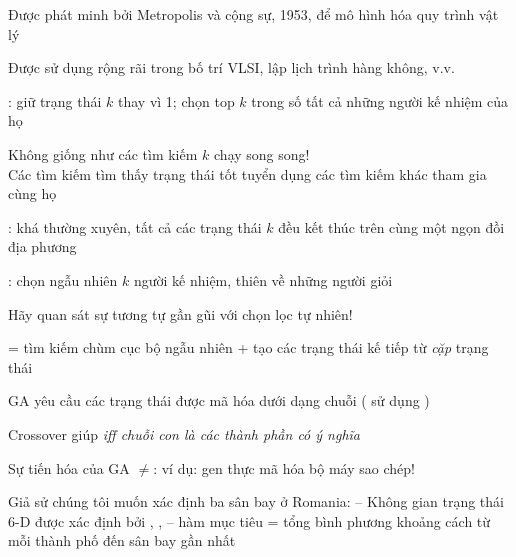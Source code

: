 \documentclass{article}
\begin{document}
\begin{huge}

Được phát minh bởi Metropolis và cộng sự, 1953, để mô hình hóa quy trình vật lý

Được sử dụng rộng rãi trong bố trí VLSI, lập lịch trình hàng không, v.v.



: giữ trạng thái $k$ thay vì 1; chọn top $k$ trong số tất cả những người kế nhiệm của họ

Không giống như các tìm kiếm $k$ chạy song song!\\
Các tìm kiếm tìm thấy trạng thái tốt tuyển dụng các tìm kiếm khác tham gia cùng họ

: khá thường xuyên, tất cả các trạng thái $k$ đều kết thúc trên cùng một ngọn đồi địa phương

: chọn ngẫu nhiên $k$ người kế nhiệm, thiên về những người giỏi

Hãy quan sát sự tương tự gần gũi với chọn lọc tự nhiên!


= tìm kiếm chùm cục bộ ngẫu nhiên + tạo các trạng thái kế tiếp từ \emph{cặp } trạng thái

\vspace*{0.2in}

\textwidth
{}


GA yêu cầu các trạng thái được mã hóa dưới dạng chuỗi ( sử dụng )

Crossover giúp \emph{iff chuỗi con là các thành phần có ý nghĩa}

\vspace*{0.2in}

\textwidth
{}

Sự tiến hóa của GA $\neq$: ví dụ: gen thực mã hóa bộ máy sao chép!


Giả sử chúng tôi muốn xác định ba sân bay ở Romania:\al
-- Không gian trạng thái 6-D được xác định bởi , , \al
-- hàm mục tiêu  = \nl
   tổng bình phương khoảng cách từ mỗi thành phố đến sân bay gần nhất


\end{huge}
\end{document}
